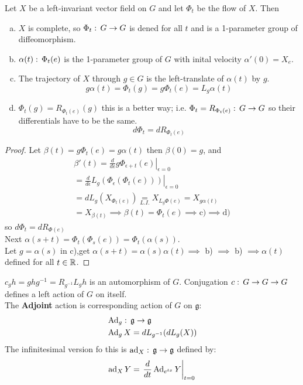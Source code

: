 \begin{teorema}
    Let $X$ be a left-invariant vector field on $G$ and let $\Phi_t$ be the flow of $X$. Then 
    \begin{enumerate}[a)]
        \item $X$ is complete, so $\Phi_t :\, G\to G$ is dened for all $t$ and is a 1-parameter group of diffeomorphism.
        \item $\alpha(t) :\, \Phi_t(e)$ is the 1-parameter group of $G$ with inital velocity $\alpha'(0) = X_e$.
        \item The trajectory of $X$ through $g\in G$ is the left-translate of $\alpha(t)$ by $g$.
            $$g\alpha(t) = \Phi_t(g) = g\Phi_t(e) = L_g\alpha(t)$$
        \item $\Phi_t(g) = R_{\Phi_t(e)} (g)$ this is a better way; i.e. $\Phi_t= R_{\Phi_t(e)}:\, G\to G$ so their differentials have to be the same.
            $$d\Phi_t = dR_{\Phi_t(e)}$$ 
    \end{enumerate}
    \begin{proof}
        Let $\beta(t) = g\Phi_t(e) = g\alpha(t)$ then $\beta(0)=g$, and 
        \begin{gather*}
        \beta'(t) = \left.\frac{d}{d\epsilon} g\Phi_{\epsilon+t} (e) \right|_{\epsilon=0}\\
        = \left.\frac{d}{d\epsilon} L_g (\Phi_\epsilon(\Phi_t(e)))\right|_{\epsilon=0}\\
        =dL_g(X_{\Phi_t(e)}) \underset{L.I.}{=} X_{L_g\Phi(e)} = X_{g\alpha(t)}\\
        =X_{\beta(t)} \implies \beta(t) = \Phi_t(e) \implies \text{c}) \implies \text{d})
        \end{gather*}
        so $d\Phi_t  = dR_{\Phi(e)}$ \\
        Next $\alpha(s+t) = \Phi_t(\Phi_s(e)) = \Phi_t(\alpha(s))$.\\
        Let $g=\alpha(s) $ in c),get $\alpha(s+t)=\alpha(s)\alpha(t)\implies$ b) $\implies $ b) $\implies \alpha(t)$ defined for all $t\in \mathbb{R}$.
    \end{proof}
\end{teorema}

\begin{ddef}
    $c_gh= ghg^{-1} = R_{g^{-1}} L_g h$ is an automorphism of $G$. Conjugation $c:\, G\to G \to G$ defines a left action of $G$ on itself.\\
    The \textbf{Adjoint} action is corresponding action of $G$ on $\mathfrak{g}$:
    \begin{align*}
        &\operatorname{Ad}_g:\, \mathfrak{g} \to \mathfrak{g}\\
        &\operatorname{Ad}_gX=dL_{g^{-1}}(dL_g(X))
    \end{align*}
    The infinitesimal version fo this is $\operatorname{ad}_X:\, \mathfrak{g}\to  \mathfrak{g} $ defined by:
    $$\operatorname{ad}_XY =\left. \frac{d}{dt}\operatorname{Ad}_{e^{tx}}Y\right|_{t=0}$$
\end{ddef}

